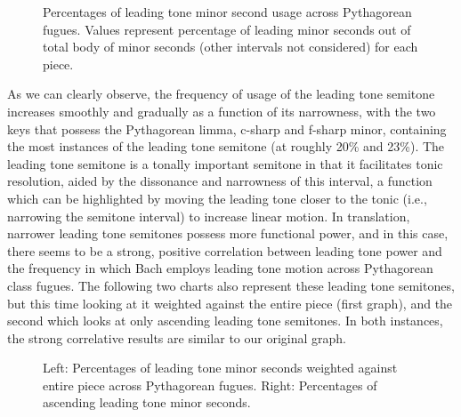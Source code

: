 \begin{figure}[H]
    \begin{center}
    \caption[Percentages of leading tone minor second usage across Pythagorean fugues. ]{Percentages of leading tone minor second usage across Pythagorean fugues. Values represent percentage of leading minor seconds out of total body of minor seconds (other intervals not considered) for each piece.}
    \end{center}
\end{figure}
    
    As we can clearly observe, the frequency of usage of the leading tone
semitone increases smoothly and gradually as a function of its
narrowness, with the two keys that possess the Pythagorean limma,
c-sharp and f-sharp minor, containing the most instances of the leading
tone semitone (at roughly 20\% and 23\%). The leading tone semitone is a
tonally important semitone in that it facilitates tonic resolution,
aided by the dissonance and narrowness of this interval, a function
which can be highlighted by moving the leading tone closer to the tonic
(i.e., narrowing the semitone interval) to increase linear motion. In
translation, narrower leading tone semitones possess more functional
power, and in this case, there seems to be a strong, positive
correlation between leading tone power and the frequency in which Bach
employs leading tone motion across Pythagorean class fugues. The
following two charts also represent these leading tone semitones, but
this time looking at it weighted against the entire piece (first graph),
and the second which looks at only ascending leading tone semitones. In
both instances, the strong correlative results are similar to our
original graph.



\begin{figure}[H]
    \begin{center}
    \caption[Percentages of leading tone minor seconds weighted against entire piece, and percentages of ascending leading tone minor seconds across Pythagorean fugues. ]{Left: Percentages of leading tone minor seconds weighted against entire piece across Pythagorean fugues. Right: Percentages of ascending leading tone minor seconds.}
    \end{center}
\end{figure}
    

